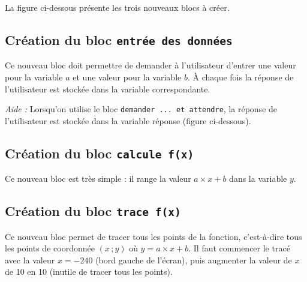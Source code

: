 \vspace{6pt}

La figure ci-dessous présente les trois nouveaux blocs à créer.




\subsection{Création du bloc \texttt{entrée des données}}


Ce nouveau bloc doit permettre de demander à l'utilisateur d'entrer une valeur pour la variable $a$ et une valeur pour la variable $b$. À chaque fois la réponse de l'utilisateur est stockée dans la variable correspondante.

\vspace{6pt}

\emph{Aide :} Lorsqu'on utilise le bloc \texttt{demander ... et attendre}, la réponse de l'utilisateur est stockée dans la variable réponse (figure ci-dessous).





\subsection{Création du bloc \texttt{calcule f(x)}}


Ce nouveau bloc est très simple : il range la valeur $a \times x + b$ dans la variable $y$.




\subsection{Création du bloc \texttt{trace f(x)}}


Ce nouveau bloc permet de tracer tous les points de la fonction, c'est-à-dire tous les points de coordonnée $(x\,;y)$ où $y=a\times x + b$. Il faut commencer le tracé avec la valeur $x=-240$ (bord gauche de l'écran), puis augmenter la valeur de $x$ de 10 en 10 (inutile de tracer tous les points).







